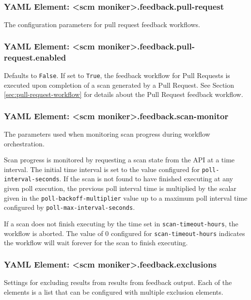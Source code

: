 \subsubsection{YAML Element: <scm moniker>.feedback.pull-request}\label{sec:yaml-feedback-pull-request}
The configuration parameters for pull request feedback workflows.

\subsubsection{YAML Element: <scm moniker>.feedback.pull-request.enabled}\label{sec:yaml-pull-request-enabled}
Defaults to \texttt{False}.  If set to \texttt{True}, the feedback workflow for Pull Requests is executed upon completion of a scan generated by
a Pull Request. See Section \ref{sec:pull-request-workflow} for details about the Pull Request feedback workflow.


\subsubsection{YAML Element: <scm moniker>.feedback.scan-monitor}\label{sec:yaml-feedback-scan-monitor}
The parameters used when monitoring scan progress during workflow orchestration. 

Scan progress is monitored by requesting a scan state from the \cxone API at
a time interval.  The initial time interval is set to the value configured for
\texttt{poll-interval-seconds}.  If the scan is not found to have finished executing
at any given poll execution, the previous poll interval time is multiplied by
the scalar given in the \texttt{poll-backoff-multiplier} value up to a maximum
poll interval time configured by \texttt{poll-max-interval-seconds}.

If a scan does not finish executing by the time set in \texttt{scan-timeout-hours}, the
workflow is aborted.  The value of 0 configured for \texttt{scan-timeout-hours} indicates
the workflow will wait forever for the scan to finish executing.

\subsubsection{YAML Element: <scm moniker>.feedback.exclusions}\label{sec:yaml-feedback-exclusions}
Settings for excluding results from results from feedback output.  Each of the elements is a list that 
can be configured with multiple exclusion elements.
